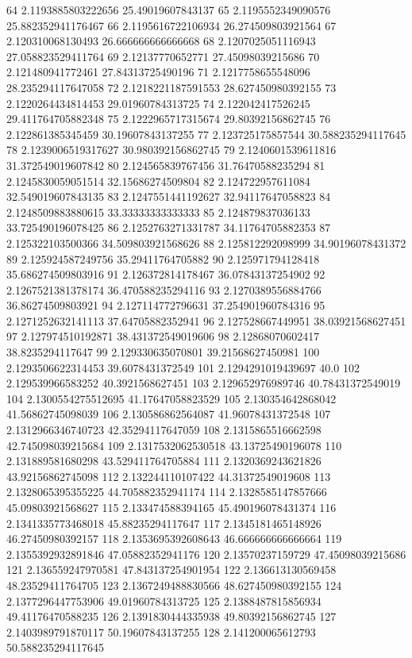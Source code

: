 {64 2.1193885803222656 25.49019607843137
65 2.1195552349090576 25.882352941176467
66 2.1195616722106934 26.274509803921564
67 2.120310068130493 26.666666666666668
68 2.1207025051116943 27.058823529411764
69 2.12137770652771 27.45098039215686
70 2.121480941772461 27.84313725490196
71 2.1217758655548096 28.235294117647058
72 2.1218221187591553 28.627450980392155
73 2.1220264434814453 29.01960784313725
74 2.122042417526245 29.411764705882348
75 2.1222965717315674 29.80392156862745
76 2.122861385345459 30.19607843137255
77 2.123725175857544 30.588235294117645
78 2.1239006519317627 30.980392156862745
79 2.1240601539611816 31.372549019607842
80 2.124565839767456 31.76470588235294
81 2.1245830059051514 32.15686274509804
82 2.124722957611084 32.549019607843135
83 2.1247551441192627 32.94117647058823
84 2.1248509883880615 33.33333333333333
85 2.124879837036133 33.725490196078425
86 2.1252763271331787 34.11764705882353
87 2.125322103500366 34.509803921568626
88 2.125812292098999 34.90196078431372
89 2.125924587249756 35.29411764705882
90 2.125971794128418 35.686274509803916
91 2.126372814178467 36.07843137254902
92 2.1267521381378174 36.470588235294116
93 2.1270389556884766 36.86274509803921
94 2.127114772796631 37.254901960784316
95 2.1271252632141113 37.64705882352941
96 2.127528667449951 38.03921568627451
97 2.127974510192871 38.431372549019606
98 2.12868070602417 38.8235294117647
99 2.129330635070801 39.21568627450981
100 2.1293506622314453 39.6078431372549
101 2.1294291019439697 40.0
102 2.129539966583252 40.3921568627451
103 2.129652976989746 40.78431372549019
104 2.1300554275512695 41.17647058823529
105 2.130354642868042 41.56862745098039
106 2.130586862564087 41.96078431372548
107 2.1312966346740723 42.35294117647059
108 2.1315865516662598 42.745098039215684
109 2.1317532062530518 43.13725490196078
110 2.131889581680298 43.529411764705884
111 2.1320369243621826 43.92156862745098
112 2.132244110107422 44.31372549019608
113 2.1328065395355225 44.705882352941174
114 2.1328585147857666 45.09803921568627
115 2.133474588394165 45.490196078431374
116 2.1341335773468018 45.88235294117647
117 2.1345181465148926 46.27450980392157
118 2.1353695392608643 46.666666666666664
119 2.1355392932891846 47.05882352941176
120 2.13570237159729 47.45098039215686
121 2.136559247970581 47.843137254901954
122 2.136613130569458 48.23529411764705
123 2.1367249488830566 48.627450980392155
124 2.1377296447753906 49.01960784313725
125 2.1388487815856934 49.41176470588235
126 2.1391830444335938 49.80392156862745
127 2.1403989791870117 50.19607843137255
128 2.141200065612793 50.588235294117645
}
